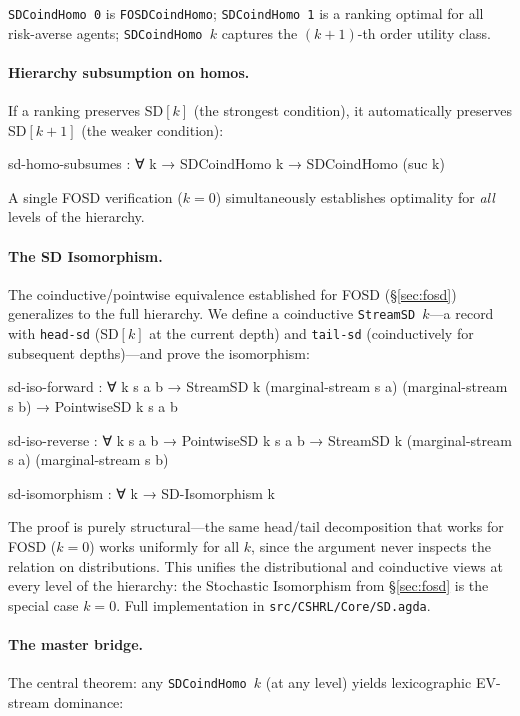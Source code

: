 \documentclass[9pt,a4paper]{article}
\newcommand{\fpath}[1]{\nolinkurl{#1}}
\theoremstyle{plain}
\theoremstyle{definition}
\theoremstyle{remark}
\begin{document}
\noindent \texttt{SDCoindHomo~0} is \texttt{FOSDCoindHomo}; \texttt{SDCoindHomo~1} is a ranking optimal for all risk-averse agents; \texttt{SDCoindHomo~$k$} captures the $(k{+}1)$-th order utility class.

\paragraph{Hierarchy subsumption on homos.}
If a ranking preserves SD$[k]$ (the strongest condition), it automatically preserves SD$[k{+}1]$ (the weaker condition):

\begin{spec}
  sd-homo-subsumes : ∀ k → SDCoindHomo k → SDCoindHomo (suc k)
\end{spec}

\noindent A single FOSD verification ($k{=}0$) simultaneously establishes optimality for \emph{all} levels of the hierarchy.

\paragraph{The SD Isomorphism.}
The coinductive/pointwise equivalence established for FOSD (\S\ref{sec:fosd}) generalizes to the full hierarchy.  We define a coinductive \texttt{StreamSD~$k$}---a record with \texttt{head-sd} (SD$[k]$ at the current depth) and \texttt{tail-sd} (coinductively for subsequent depths)---and prove the isomorphism:

\begin{spec}
  sd-iso-forward : ∀ k s a b →
    StreamSD k (marginal-stream s a) (marginal-stream s b)
    → PointwiseSD k s a b

  sd-iso-reverse : ∀ k s a b →
    PointwiseSD k s a b
    → StreamSD k (marginal-stream s a) (marginal-stream s b)

  sd-isomorphism : ∀ k → SD-Isomorphism k
\end{spec}

\noindent The proof is purely structural---the same head/tail decomposition that works for FOSD ($k{=}0$) works uniformly for all $k$, since the argument never inspects the relation on distributions.  This unifies the distributional and coinductive views at every level of the hierarchy: the Stochastic Isomorphism from \S\ref{sec:fosd} is the special case $k{=}0$.  Full implementation in \fpath{src/CSHRL/Core/SD.agda}.

\paragraph{The master bridge.}
The central theorem: any \texttt{SDCoindHomo~$k$} (at any level) yields lexicographic EV-stream dominance:
\end{document}
